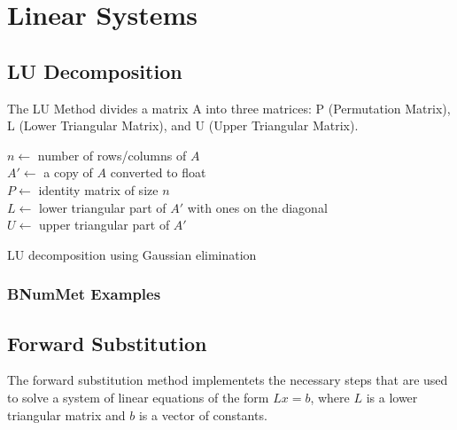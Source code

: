 \section*{Linear Systems}
\subsection*{LU Decomposition}
The LU Method divides a matrix A into three matrices: P (Permutation Matrix), L (Lower Triangular Matrix), and U (Upper Triangular Matrix).

\begin{algorithm}[H]
\label{alg:LU decomposition using Gaussian elimination}
    \SetAlgoLined
    $n \gets$ number of rows/columns of $A$ \\
    $A' \gets$ a copy of $A$ converted to float \\
    $P \gets$ identity matrix of size $n$ \\
    $L \gets$ lower triangular part of $A'$ with ones on the diagonal \\
    $U \gets$ upper triangular part of $A'$ \\
    \caption{LU decomposition using Gaussian elimination}
    
\end{algorithm}
\subsubsection*{BNumMet Examples}



\subsection*{Forward Substitution}
The forward substitution method implementets the necessary steps that are used to solve a system of linear equations of the form $Lx = b$, where $L$ is a lower triangular matrix and $b$ is a vector of constants.

